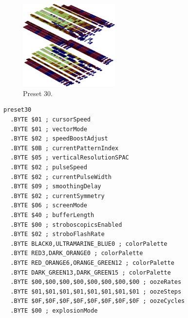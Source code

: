 \clearpage
\begin{minipage}[b]{0.48\linewidth}
\begin{figure}[H]                                                          
  \centering                                                             
  \begin{adjustbox}{width=5cm,center}                                   
  \includegraphics[width=5cm]{src/colorspace_presets/preset30-45.png}%
  \end{adjustbox}                                                        
\caption*{Preset 30.}                                           
\end{figure}                                                               
\end{minipage}
\hspace{0.1cm}
\begin{minipage}[b]{0.48\linewidth}                            
\begin{lstlisting}[basicstyle=\ttfamily\tiny]
preset30
  .BYTE $01 ; cursorSpeed
  .BYTE $01 ; vectorMode
  .BYTE $02 ; speedBoostAdjust
  .BYTE $0B ; currentPatternIndex
  .BYTE $05 ; verticalResolutionSPAC
  .BYTE $02 ; pulseSpeed
  .BYTE $02 ; currentPulseWidth
  .BYTE $09 ; smoothingDelay
  .BYTE $02 ; currentSymmetry
  .BYTE $06 ; screenMode
  .BYTE $40 ; bufferLength
  .BYTE $00 ; stroboscopicsEnabled
  .BYTE $02 ; stroboFlashRate
  .BYTE BLACK0,ULTRAMARINE_BLUE0 ; colorPalette
  .BYTE RED3,DARK_ORANGE0 ; colorPalette
  .BYTE RED_ORANGE6,ORANGE_GREEN12 ; colorPalette
  .BYTE DARK_GREEN13,DARK_GREEN15 ; colorPalette
  .BYTE $00,$00,$00,$00,$00,$00,$00,$00 ; oozeRates
  .BYTE $01,$01,$01,$01,$01,$01,$01,$01 ; oozeSteps
  .BYTE $0F,$0F,$0F,$0F,$0F,$0F,$0F,$0F ; oozeCycles
  .BYTE $00 ; explosionMode
\end{lstlisting}
\end{minipage}

\vspace*{-0.5cm}

